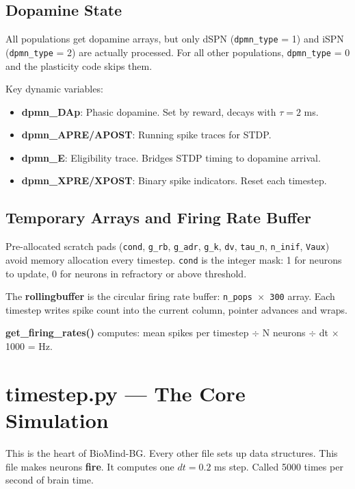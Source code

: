 \documentclass[11pt,a4paper]{article}
\begin{document}
\subsection{Dopamine State}

All populations get dopamine arrays, but only dSPN (\texttt{dpmn\_type} = 1) and iSPN (\texttt{dpmn\_type} = 2) are actually processed. For all other populations, \texttt{dpmn\_type} = 0 and the plasticity code skips them.

Key dynamic variables:
\begin{itemize}
    \item \textbf{dpmn\_DAp}: Phasic dopamine. Set by reward, decays with $\tau = 2$ ms.
    \item \textbf{dpmn\_APRE/APOST}: Running spike traces for STDP.
    \item \textbf{dpmn\_E}: Eligibility trace. Bridges STDP timing to dopamine arrival.
    \item \textbf{dpmn\_XPRE/XPOST}: Binary spike indicators. Reset each timestep.
\end{itemize}

\subsection{Temporary Arrays and Firing Rate Buffer}

Pre-allocated scratch pads (\texttt{cond}, \texttt{g\_rb}, \texttt{g\_adr}, \texttt{g\_k}, \texttt{dv}, \texttt{tau\_n}, \texttt{n\_inif}, \texttt{Vaux}) avoid memory allocation every timestep. \texttt{cond} is the integer mask: 1 for neurons to update, 0 for neurons in refractory or above threshold.

The \textbf{rollingbuffer} is the circular firing rate buffer: \texttt{n\_pops $\times$ 300} array. Each timestep writes spike count into the current column, pointer advances and wraps.

\textbf{get\_firing\_rates()} computes: mean spikes per timestep $\div$ N neurons $\div$ dt $\times$ 1000 = Hz.

\newpage
\section{timestep.py --- The Core Simulation}

This is the heart of BioMind-BG. Every other file sets up data structures. This file makes neurons \textbf{fire}. It computes one $dt = 0.2$ ms step. Called 5000 times per second of brain time.
\end{document}
